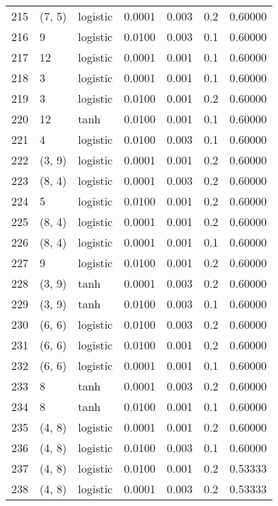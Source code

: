 \begin{tabular}{lllrrrr}
215 &      (7, 5) &  logistic &  0.0001 &  0.003 &  0.2 &   0.60000 \\
216 &           9 &  logistic &  0.0100 &  0.003 &  0.1 &   0.60000 \\
217 &          12 &  logistic &  0.0001 &  0.001 &  0.1 &   0.60000 \\
218 &           3 &  logistic &  0.0001 &  0.001 &  0.1 &   0.60000 \\
219 &           3 &  logistic &  0.0100 &  0.001 &  0.2 &   0.60000 \\
220 &          12 &      tanh &  0.0100 &  0.001 &  0.1 &   0.60000 \\
221 &           4 &  logistic &  0.0100 &  0.003 &  0.1 &   0.60000 \\
222 &      (3, 9) &  logistic &  0.0001 &  0.001 &  0.2 &   0.60000 \\
223 &      (8, 4) &  logistic &  0.0001 &  0.003 &  0.2 &   0.60000 \\
224 &           5 &  logistic &  0.0100 &  0.001 &  0.2 &   0.60000 \\
225 &      (8, 4) &  logistic &  0.0001 &  0.001 &  0.2 &   0.60000 \\
226 &      (8, 4) &  logistic &  0.0001 &  0.001 &  0.1 &   0.60000 \\
227 &           9 &  logistic &  0.0100 &  0.001 &  0.2 &   0.60000 \\
228 &      (3, 9) &      tanh &  0.0001 &  0.003 &  0.2 &   0.60000 \\
229 &      (3, 9) &      tanh &  0.0100 &  0.003 &  0.1 &   0.60000 \\
230 &      (6, 6) &  logistic &  0.0100 &  0.003 &  0.2 &   0.60000 \\
231 &      (6, 6) &  logistic &  0.0100 &  0.001 &  0.2 &   0.60000 \\
232 &      (6, 6) &  logistic &  0.0001 &  0.001 &  0.1 &   0.60000 \\
233 &           8 &      tanh &  0.0001 &  0.003 &  0.2 &   0.60000 \\
234 &           8 &      tanh &  0.0100 &  0.001 &  0.1 &   0.60000 \\
235 &      (4, 8) &  logistic &  0.0001 &  0.001 &  0.2 &   0.60000 \\
236 &      (4, 8) &  logistic &  0.0100 &  0.003 &  0.1 &   0.60000 \\
237 &      (4, 8) &  logistic &  0.0100 &  0.001 &  0.2 &   0.53333 \\
238 &      (4, 8) &  logistic &  0.0001 &  0.003 &  0.2 &   0.53333 \\

\end{tabular}

